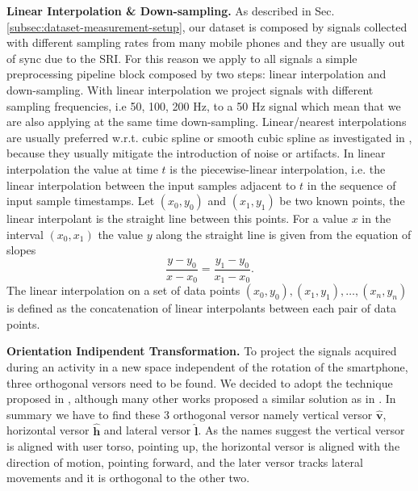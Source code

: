 \textbf{Linear Interpolation \& Down-sampling.} As described in
Sec. \ref{subsec:dataset-measurement-setup}, our dataset is composed
by signals collected with different sampling rates from many mobile
phones and they are usually out of sync due to the SRI. For this
reason we apply to all signals a simple preprocessing pipeline block
composed by two steps: linear interpolation and down-sampling. With
linear interpolation we project signals with different sampling
frequencies, i.e 50, 100, 200 Hz, to a 50 Hz signal which mean that
we are also applying at the same time down-sampling. Linear/nearest
interpolations are usually preferred w.r.t. cubic spline or smooth
cubic spline as investigated in \cite{stisen2015smart}, because they
usually mitigate the introduction of noise or artifacts. In linear
interpolation the value at time $t$ is the piecewise-linear
interpolation, i.e. the linear interpolation between the input samples
adjacent to $t$ in the sequence of input sample timestamps. Let $(x_0,
y_0)$ and $(x_1, y_1)$ be two known points, the linear interpolant is
the straight line between this points. For a value $x$ in the interval
$(x_0, x_1)$ the value $y$ along the straight line is given from the
equation of slopes
\begin{equation}
  \label{eq:linear-interpolation}
  \frac{y - y_0}{x - x_0} = \frac{y_1 - y_0}{x_1 - x_0}.
\end{equation}
The linear interpolation on a set of data points $(x_0, y_0), (x_1, y_1), \ldots, (x_n, y_n)$ is defined as the concatenation of linear interpolants between each pair of data points.


\vspace{1em}
\textbf{Orientation Indipendent Transformation.}
To project the signals acquired during an activity in a new space independent of the rotation of the smartphone, three orthogonal versors need to be found. We decided to adopt the technique proposed in \cite{gadaleta2018idnet}, although many other works proposed a similar solution as in \cite{kunze2009way, henpraserttae2011accurate}. In summary we have to find these 3 orthogonal versor namely vertical versor $\boldsymbol{\hat{v}}$, horizontal versor $\boldsymbol{\hat{h}}$ and lateral versor $\boldsymbol{\hat{l}}$. As the names suggest the vertical versor is aligned with user torso, pointing up, the horizontal versor is aligned with the direction of motion, pointing forward, and the later versor tracks lateral movements and it is orthogonal to the other two.

